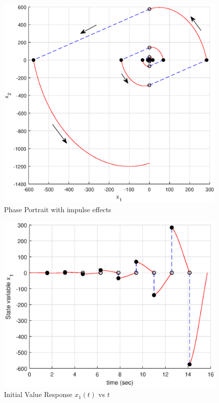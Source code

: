 \documentclass[11pt,a4paper]{article}
\begin{document}
\begin{figure}
\centering
\includegraphics[scale=0.6]{FG2.eps} 
\caption{Phase Portrait with impulse effects}
\end{figure}

\begin{figure}
\centering
\includegraphics[scale=0.8]{FG3.eps} 
\caption{Initial Value Response $x_1(t)$ vs $t$}
\end{figure}
\end{document}
